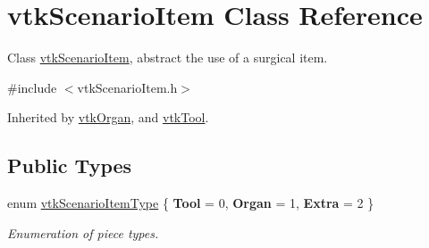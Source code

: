 \hypertarget{classvtkScenarioItem}{
\section{vtkScenarioItem Class Reference}
\label{classvtkScenarioItem}
}


Class \hyperlink{classvtkScenarioItem}{vtkScenarioItem}, abstract the use of a surgical item.  




{\ttfamily \#include $<$vtkScenarioItem.h$>$}



Inherited by \hyperlink{classvtkOrgan}{vtkOrgan}, and \hyperlink{classvtkTool}{vtkTool}.

\subsection*{Public Types}
\begin{DoxyCompactItemize}
\item 
enum \hyperlink{classvtkScenarioItem_a77bcdf6979a30db08fa7934f218994e0}{vtkScenarioItemType} \{ {\bfseries Tool} =  0, 
{\bfseries Organ} =  1, 
{\bfseries Extra} =  2
 \}
\begin{DoxyCompactList}\small\item\em Enumeration of piece types. \item\end{DoxyCompactList}\end{DoxyCompactItemize}
